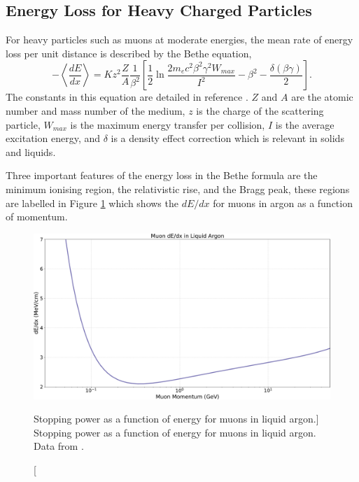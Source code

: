 \subsection{Energy Loss for Heavy Charged Particles}
For heavy particles such as muons at moderate energies, the mean rate of 
energy loss per unit distance is described by the Bethe equation,
\begin{equation}
	- \left< \frac{dE}{dx}\right> = K z^2 \frac{Z}{A} \frac{1}{\beta^2} 
	\left[ \frac{1}{2} \ln \frac{2 m_e c^2 \beta^2 \gamma^2 W_{max}}{I^2} -
	\beta^2 - \frac{\delta(\beta \gamma)}{2}\right].
\end{equation}
The constants in this equation are detailed in reference
\cite{PhysRevD.98.030001}. $Z$ and $A$ are the atomic number and mass number of
the medium, $z$ is the charge of the scattering particle, $W_{max}$ is the 
maximum energy transfer per collision, $I$ is the average excitation energy, 
and $\delta$ is a density effect correction which is relevant in solids and 
liquids. 

Three important features of the energy loss in the Bethe formula are the minimum
ionising region, the relativistic rise, and the Bragg peak, these regions are
labelled in Figure \ref{fig:muon_dedx} which shows the $dE/dx$ for muons in 
argon as a function of momentum.
\begin{figure}

	\centering

	\includegraphics[width=\textwidth]{figures/muon_dedx_argon.pdf}

	\caption
	[Stopping power as a function of energy for muons in liquid argon.]
	{ Stopping power as a function of energy for muons in liquid argon. Data from
	\cite{pdg_atomictables}.}

	\label{fig:muon_dedx}

\end{figure}


